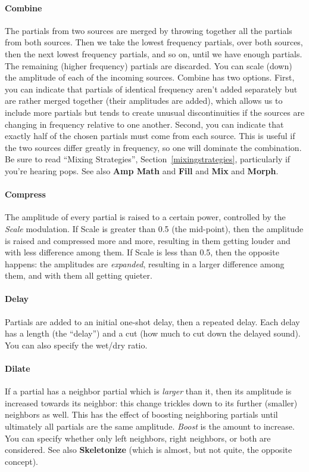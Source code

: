 \documentclass{article}
\begin{document}
\paragraph{Combine} The partials from two sources are merged by throwing together all the partials from both sources.  Then we take the lowest frequency partials, over both sources, then the next lowest frequency partials, and so on, until we have enough partials.  The remaining (higher frequency) partials are discarded.  You can scale (down) the amplitude of each of the incoming sources.  Combine has two options.  First, you can indicate that partials of identical frequency aren't added separately but are rather merged together (their amplitudes are added), which allows us to include more partials but tends to create unusual discontinuities if the sources are changing in frequency relative to one another.  Second, you can indicate that exactly half of the chosen partials must come from each source.  This is useful if the two sources differ greatly in frequency, so one will dominate the combination.  Be sure to read ``Mixing Strategies'', Section~\ref{mixingstrategies}, particularly if you're hearing pops.  See also {\bf Amp Math} and {\bf Fill} and {\bf Mix} and {\bf Morph}.

\paragraph{Compress}  The amplitude of every partial is raised to a certain power, controlled by the {\it Scale} modulation.  If Scale is greater than 0.5 (the mid-point), then the amplitude is raised and compressed more and more, resulting in them getting louder and with less difference among them.  If Scale is less than 0.5, then the opposite happens: the amplitudes are {\it expanded}, resulting in a larger difference among them, and with them all getting quieter.

\paragraph{Delay}  Partials are added to an initial one-shot delay, then a repeated delay.  Each delay has a length (the ``delay'') and a cut (how much to cut down the delayed sound).  You can also specify the wet/dry ratio.

\paragraph{Dilate} If a partial has a neighbor partial which is {\it larger} than it, then its amplitude is increased towards its neighbor: this change trickles down to its further (smaller) neighbors as well.  This has the effect of boosting neighboring partials until ultimately all partials are the same amplitude.  {\it Boost} is the amount to increase.  You can specify whether only left neighbors, right neighbors, or both are considered.  See also {\bf Skeletonize} (which is almost, but not quite, the opposite concept).
\end{document}
